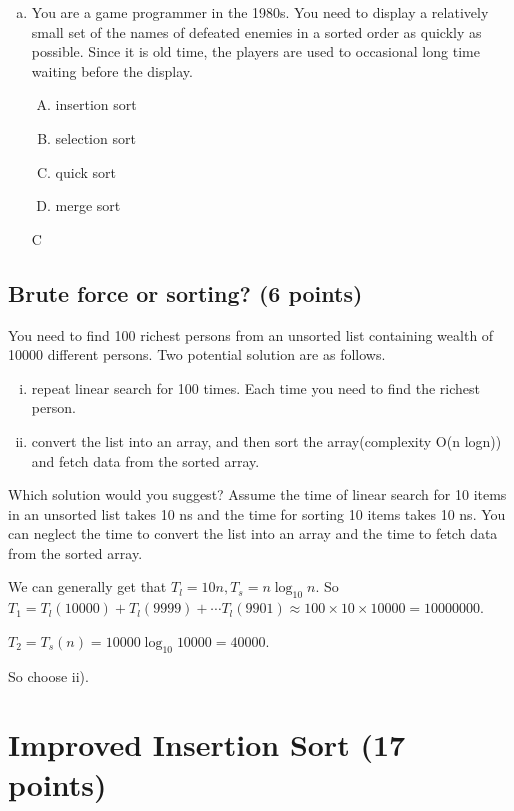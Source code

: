 \documentclass[11pt]{exam}
\begin{document}
\begin{enumerate}[(a)]
    \item You are a game programmer in the 1980s. You need to display a relatively small set of the names of defeated enemies in a sorted order as quickly as possible. Since it is old time, the players are used to occasional long time waiting before the display.
          \begin{enumerate}[A)]
              \item insertion sort
              \item selection sort
              \item quick sort
              \item merge sort
          \end{enumerate}
          \begin{solution}
            C
          \end{solution}
\end{enumerate}

\subsection{Brute force or sorting? (6 points)}
You need to find 100 richest persons from an unsorted list containing wealth of 10000 different persons. Two potential solution are as follows.
\begin{enumerate}[i)]
    \item repeat linear search for 100 times. Each time you need to find the richest person.
    \item convert the list into an array, and then sort the array(complexity O(n logn)) and fetch data from the sorted array.
\end{enumerate}
Which solution would you suggest? Assume the time of linear search for 10 items in an unsorted list takes 10 ns and the time for sorting 10 items takes 10 ns. You can neglect the time to convert the list into an array and the time to fetch data from the sorted array.

\begin{solution}
    We can generally get that $T_{l}=10n,T_{s}=n\log_{10} n$.
    So $T_1 = T_{l} (10000)+T_{l}(9999) + \cdots T_{l}(9901) \approx 100 \times 10 \times 10000 = 10000000$.

    $T_2 = T_s(n) = 10000 \log_{10} 10000 = 40000$.

    So choose ii).
\end{solution}

\section{Improved Insertion Sort (17 points)}
\end{document}
